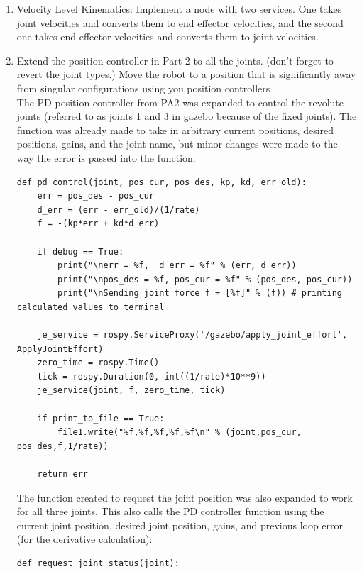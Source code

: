 \documentclass[10pt]{article}
\begin{document}
\begin{enumerate}
	\item Velocity Level Kinematics: Implement a node with two services. One takes joint velocities and converts them to end effector velocities, and the second one takes end effector velocities and converts them to joint velocities.
	
	\item Extend the position controller in Part 2 to all the joints. (don't forget to revert the joint types.) Move the robot to a position that is significantly away from singular configurations using you position controllers
	\\
	
	The PD position controller from PA2 was expanded to control the revolute joints (referred to as joints 1 and 3 in gazebo because of the fixed joints). The function was already made to take in arbitrary current positions, desired positions, gains, and the joint name, but minor changes were made to the way the error is passed into the function:
		
\begin{lstlisting}[style=Matlab-editor,basicstyle=\mlttfamily,escapechar=`]
def pd_control(joint, pos_cur, pos_des, kp, kd, err_old):
	err = pos_des - pos_cur
	d_err = (err - err_old)/(1/rate)
	f = -(kp*err + kd*d_err)
	
	if debug == True:
		print("\nerr = %f,  d_err = %f" % (err, d_err))
		print("\npos_des = %f, pos_cur = %f" % (pos_des, pos_cur))
		print("\nSending joint force f = [%f]" % (f)) # printing calculated values to terminal
	
	je_service = rospy.ServiceProxy('/gazebo/apply_joint_effort', ApplyJointEffort)
	zero_time = rospy.Time()
	tick = rospy.Duration(0, int((1/rate)*10**9))
	je_service(joint, f, zero_time, tick)
	
	if print_to_file == True:
		file1.write("%f,%f,%f,%f,%f\n" % (joint,pos_cur, pos_des,f,1/rate)) 
	
	return err
\end{lstlisting} 

	The function created to request the joint position was also expanded to work for all three joints. This also calls the PD controller function using the current joint position, desired joint position, gains, and previous loop error (for the derivative calculation):
		
\begin{lstlisting}[style=Matlab-editor,basicstyle=\mlttfamily,escapechar=`]
def request_joint_status(joint):


\end{lstlisting}
\end{enumerate}
\end{document}
